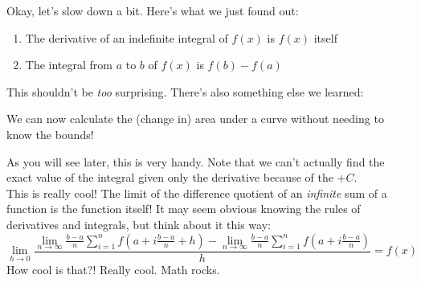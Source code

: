 \documentclass[../revisedmain.tex]{subfiles}
\begin{document}
Okay, let's slow down a bit. Here's what we just found out:
\begin{enumerate}
	\item The derivative of an indefinite integral of $f(x)$ is $f(x)$ itself
	\item The integral from $a$ to $b$ of $f(x)$ is $f(b)-f(a)$
\end{enumerate}
This shouldn't be \textit{too} surprising. There's also something else we learned:
\begin{displayquote}
	We can now calculate the (change in) area under a curve without needing to know the bounds!
\end{displayquote}
As you will see later, this is very handy. Note that we can't actually find the exact value of the integral given only the derivative because of the $+C$.\\
This is really cool! The limit of the difference quotient of an \textit{infinite} sum of a function is the function itself! It may seem obvious knowing the rules of derivatives and integrals, but think about it this way:
\[
\lim_{h\to 0}\frac{
	\lim_{n\to\infty}\frac{b-a}{n}\sum_{i=1}^{n} f\left(a+i\frac{b-a}{n}+h\right) - \lim_{n\to\infty}\frac{b-a}{n}\sum_{i=1}^{n} f\left(a+i\frac{b-a}{n}\right) 
}{
h
} = f(x)
\]
How cool is that?! Really cool. Math rocks.\\
\end{document}
